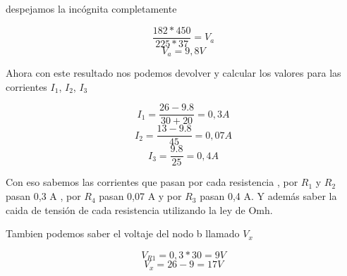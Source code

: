 \begin{example}
        despejamos la incógnita completamente

        \begin{equation*}
        \frac{182*450}{225*37} = V_a
        \end{equation*}
        \begin{equation*}
        V_a =9,8 V
        \end{equation*}

        Ahora con este resultado nos podemos devolver y calcular los valores para las corrientes $I_1$, $I_2$, $I_3$

        \begin{equation*}
        I_1 = \frac{26-9.8}{30+20} = 0,3 A
        \end{equation*}
        \begin{equation*}
        I_2 = \frac{13-9.8}{45} = 0,07 A
        \end{equation*}
        \begin{equation*}
        I_3 = \frac{9.8}{25} = 0,4 A
        \end{equation*}

        Con eso sabemos las corrientes que pasan por cada resistencia , por $R_1$ y  $R_2$ pasan 0,3 A , por $R_4$ pasan 0,07 A y por $R_3$ pasan 0,4 A. Y además saber la caida de tensión de cada resistencia utilizando la ley de Omh.

        Tambien podemos saber el voltaje del nodo b llamado $V_x$

        \begin{equation*}
        V_{R1} = 0,3*30 = 9 V
        \end{equation*}
        \begin{equation*}
        V_x = 26-9 = 17 V
        \end{equation*}



    \end{example}


